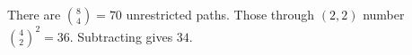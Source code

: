 There are $\binom84=70$ unrestricted paths. Those through $(2,2)$ number $\binom42^2=36$. Subtracting gives $\boxed{34}$.

